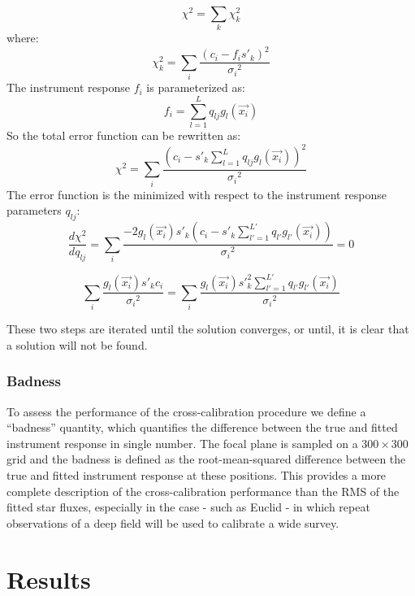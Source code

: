 \documentclass[manuscript]{aastex}
\begin{document}
\begin{displaymath}
\chi^2 = \sum_{k} \chi^2_k
\end{displaymath}
where:
\begin{displaymath}
\chi^2_k = \sum_{i} \frac{(c_i-f_{i}s'_{k})^2}{{\sigma_i}^2}
\end{displaymath}
The instrument response $f_i$ is parameterized as:
\begin{displaymath}
f_{i} = \sum_{l = 1}^L q_{lj} g_l(\vec{x_i})
\end{displaymath}
So the total error function can be rewritten as:
\begin{displaymath}
\chi^2 = \sum_{i} \frac{(c_i- s'_{k} \sum_{l = 1}^L q_{lj} g_l(\vec{x_i}))^2}{{\sigma_i}^2}
\end{displaymath}
The error function is the minimized with respect to the instrument response parameters $q_{lj}$:
\begin{displaymath}
\frac{d\chi^2}{dq_{lj}} = \sum_{i} \frac{-2 g_l(\vec{x_i}) s'_{k} (c_i- s'_{k} \sum_{l' = 1}^{L'} q_{l'} g_{l'}(\vec{x_i}))}{{\sigma_i}^2} = 0
\end{displaymath}

\begin{displaymath}
\sum_{i} \frac{g_l(\vec{x_i}) s'_{k} c_i}{{\sigma_i}^2} = \sum_{i} \frac{g_l (\vec{x_i}) s'^2_{k} \sum_{l' = 1}^{L'} q_{l'} g_{l'} (\vec{x_i})} {{\sigma_i}^2}
\end{displaymath}

These two steps are iterated until the solution converges, or until, it is clear that a solution will not be found. 

\subsubsection{Badness}
To assess the performance of the cross-calibration procedure we define a ``badness'' quantity, which quantifies the difference between the true and fitted instrument response in single number. The focal plane is sampled on a $300 \times 300$ grid and the badness is defined as the root-mean-squared difference between the true and fitted instrument response at these positions. This provides a more complete description of the cross-calibration performance than the RMS of the fitted star fluxes, especially in the case - such as Euclid - in which repeat observations of a deep field will be used to calibrate a wide survey.

\section{Results}
\end{document}

